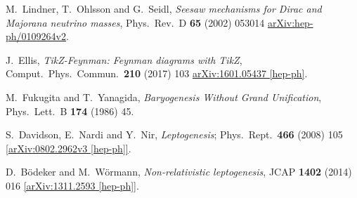 \begin{thebibliography}{56}
M.~Lindner, T.~Ohlsson and G.~Seidl,
\textit{Seesaw mechanisms for Dirac and Majorana neutrino masses},
Phys.\ Rev.\ D {\textbf{ 65}} (2002) 053014
\href{https://arxiv.org/abs/hep-ph/0109264v2}{arXiv:hep-ph/0109264v2}.

J.~Ellis,
\textit{TikZ-Feynman: Feynman diagrams with TikZ},
Comput.\ Phys.\ Commun.\  {\textbf {210}} (2017) 103
\href{https://arxiv.org/abs/1601.05437}{arXiv:1601.05437 [hep-ph]}.

M.~Fukugita and T.~Yanagida,
\textit{Baryogenesis Without Grand Unification},
Phys.\ Lett.\ B {\textbf{174}} (1986) 45.

S.~Davidson, E.~Nardi and Y.~Nir,
\textit{Leptogenesis};
Phys.\ Rept.\  {\textbf{466}} (2008) 105
\href{https://arxiv.org/abs/0802.2962v3}{[arXiv:0802.2962v3 [hep-ph]]}.

D.~Bödeker and M.~Wörmann,
\textit{Non-relativistic leptogenesis},
JCAP {\textbf{1402}} (2014) 016
\href{https://arxiv.org/abs/1311.2593}{[arXiv:1311.2593 [hep-ph]]}.

\end{thebibliography}
